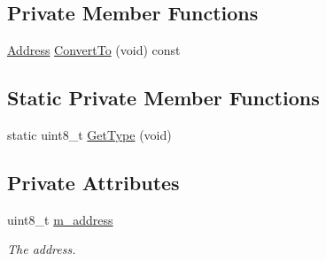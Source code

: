 \subsection*{Private Member Functions}
\begin{DoxyCompactItemize}
\item 
\hyperlink{classns3_1_1Address}{Address} \hyperlink{classns3_1_1UanAddress_acebeed57552c4305018098733033d5a4}{Convert\+To} (void) const 
\end{DoxyCompactItemize}
\subsection*{Static Private Member Functions}
\begin{DoxyCompactItemize}
\item 
static uint8\+\_\+t \hyperlink{classns3_1_1UanAddress_aaf657be632d2c9ed54ffd28e30d915a7}{Get\+Type} (void)
\end{DoxyCompactItemize}
\subsection*{Private Attributes}
\begin{DoxyCompactItemize}
\item 
uint8\+\_\+t \hyperlink{classns3_1_1UanAddress_a1c8a1aac56a876bbd5e61b25e70d6405}{m\+\_\+address}
\begin{DoxyCompactList}\small\item\em The address. \end{DoxyCompactList}\end{DoxyCompactItemize}
